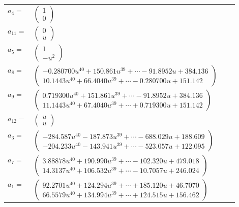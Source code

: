 \documentclass[1p]{elsarticle_modified}
\theoremstyle{definition}
\begin{document}
\begin{tabular}{m{7pt} m{180pt} m{7pt} m{180pt} }
\flushright $a_{4}=$&$\begin{pmatrix}1\\0\end{pmatrix}$ \\
\flushright $a_{11}=$&$\begin{pmatrix}0\\u\end{pmatrix}$ \\
\flushright $a_{5}=$&$\begin{pmatrix}1\\- u^2\end{pmatrix}$ \\
\flushright $a_{8}=$&$\begin{pmatrix}-0.280700 u^{40}+150.861 u^{39}+\cdots-91.8952 u+384.136\\10.1443 u^{40}+66.4040 u^{39}+\cdots-0.280700 u+151.142\end{pmatrix}$ \\
\flushright $a_{9}=$&$\begin{pmatrix}0.719300 u^{40}+151.861 u^{39}+\cdots-91.8952 u+384.136\\11.1443 u^{40}+67.4040 u^{39}+\cdots+0.719300 u+151.142\end{pmatrix}$ \\
\flushright $a_{12}=$&$\begin{pmatrix}u\\u\end{pmatrix}$ \\
\flushright $a_{3}=$&$\begin{pmatrix}-284.587 u^{40}-187.873 u^{39}+\cdots-688.029 u+188.609\\-204.233 u^{40}-143.941 u^{39}+\cdots-523.057 u+122.095\end{pmatrix}$ \\
\flushright $a_{7}=$&$\begin{pmatrix}3.88878 u^{40}+190.990 u^{39}+\cdots-102.320 u+479.018\\14.3137 u^{40}+106.532 u^{39}+\cdots-10.7057 u+246.024\end{pmatrix}$ \\
\flushright $a_{1}=$&$\begin{pmatrix}92.2701 u^{40}+124.294 u^{39}+\cdots+185.120 u+46.7070\\66.5579 u^{40}+134.994 u^{39}+\cdots+124.515 u+156.462\end{pmatrix}$ \\

\end{tabular}
\end{document}
